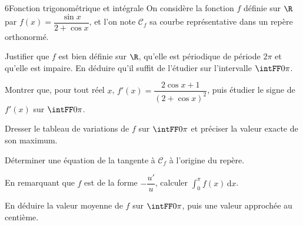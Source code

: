 \begin{exoBac}{6}{Fonction trigonométrique et intégrale}
On considère la fonction $f$ définie sur $\R$ par $f(x)=\dfrac{\sin x}{2+\cos x}$, et l'on note $\mathcal{C}_f$ sa courbe
représentative dans un repère orthonormé.
\begin{questions}
  \item Justifier que $f$ est bien définie sur $\R$, qu'elle est périodique de période $2\pi$ et qu'elle est impaire. En déduire qu'il
    suffit de l'étudier sur l'intervalle $\intFF0\pi$.
  \item Montrer que, pour tout réel $x$, $f'(x)=\dfrac{2\cos x+1}{(2+\cos x)^{2}}$, puis étudier le signe de $f'(x)$ sur $\intFF0\pi$.
  \item Dresser le tableau de variations de $f$ sur $\intFF0\pi$ et préciser la valeur exacte de son maximum.
  \item Déterminer une équation de la tangente à $\mathcal{C}_f$ à l'origine du repère.
\end{questions}
\begin{questions}[resume]
  \item En remarquant que $f$ est de la forme $-\dfrac{u'}{u}$, calculer $\displaystyle\int_0^{\pi}f(x)\,\mathrm{d}x$.
  \item En déduire la valeur moyenne de $f$ sur $\intFF0\pi$, puis une valeur approchée au centième.
\end{questions}
\end{exoBac}

